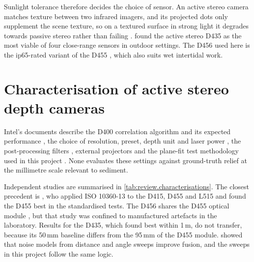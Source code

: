 Sunlight tolerance therefore decides the choice of sensor. An active stereo camera matches texture between two infrared imagers, and its projected dots only supplement the scene texture, so on a textured surface in strong light it degrades towards passive stereo rather than failing \citep{keselmanIntelRRealSenseTMStereoscopic2017,ProjectorsD400Series}. \citet{vitComparingRGBDSensors2018} found the active stereo D435 as the most viable of four close-range sensors in outdoor settings. The D456 used here is the \gls{ip65}-rated variant of the D455 \citep{intel_d456}, which also suits wet intertidal work.

\section{Characterisation of active stereo depth cameras}
\label{sec:review.characterisation}
Intel's documents describe the D400 correlation algorithm and its expected performance \citep{keselmanIntelRRealSenseTMStereoscopic2017}, the choice of resolution, preset, depth unit and laser power \citep{TuningDepthCameras}, the post-processing filters \citep{DepthPostProcessingIntel}, external projectors \citep{ProjectorsD400Series} and the plane-fit test methodology used in this project \citep{CameraDepthTesting}. None evaluates these settings against ground-truth relief at the millimetre scale relevant to sediment.

Independent studies are summarised in \autoref{tab:review.characterisations}. The closest precedent is \citet{serviMetrologicalCharacterizationComparison2021}, who applied ISO 10360-13 to the D415, D455 and L515 and found the D455 best in the standardised tests. The D456 shares the D455 optical module \citep{intel_d456}, but that study was confined to manufactured artefacts in the laboratory. Results for the D435, which \citet{rustlerEmpiricalComparisonFour2025} found best within 1\,m, do not transfer, because its 50\,mm \gls{baseline} differs from the 95\,mm of the D455 module. \citet{nguyenModelingKinectSensor2012} showed that noise models from distance and angle sweeps improve fusion, and the sweeps in this project follow the same logic.

